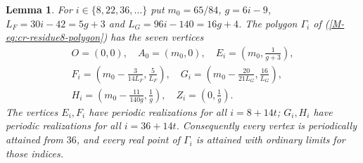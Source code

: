 \documentclass[11pt,reqno]{amsart}
\theoremstyle{plain}
\theoremstyle{plain}
\theoremstyle{plain}
\newtheorem{Slemma}[Stheorem]{Lemma}
\begin{document}
\begin{Slemma}\label{S-lem:cr-residue8-vertices}
For $i\in\{8,22,36,\ldots\}$ put $m_0=65/84$, $g=6i-9$,
$L_F=30i-42=5g+3$ and $L_G=96i-140=16g+4$. The polygon
$\Gamma_i$ of \textup{(\ref*{M-eq:cr-residue8-polygon})} has the seven vertices
\begin{equation}\label{S-eq:cr-seven-vertices}
 \begin{gathered}
 O=(0,0),\quad A_0=(m_0,0),\quad
 E_i=\left(m_0,\frac1{g+3}\right),\\
 F_i=\left(m_0-\frac3{14L_F},\frac5{L_F}\right),\quad
 G_i=\left(m_0-\frac{20}{21L_G},\frac{16}{L_G}\right),\\
 H_i=\left(m_0-\frac{11}{140g},\frac1g\right),\quad
 Z_i=\left(0,\frac1g\right).
 \end{gathered}
\end{equation}
The vertices $E_i,F_i$ have periodic realizations for all $i=8+14t$;
$G_i,H_i$ have periodic realizations for all $i=36+14t$.
Consequently every vertex is periodically attained from $36$, and
every real point of $\Gamma_i$ is attained with ordinary limits
for those indices.
\end{Slemma}
\end{document}
